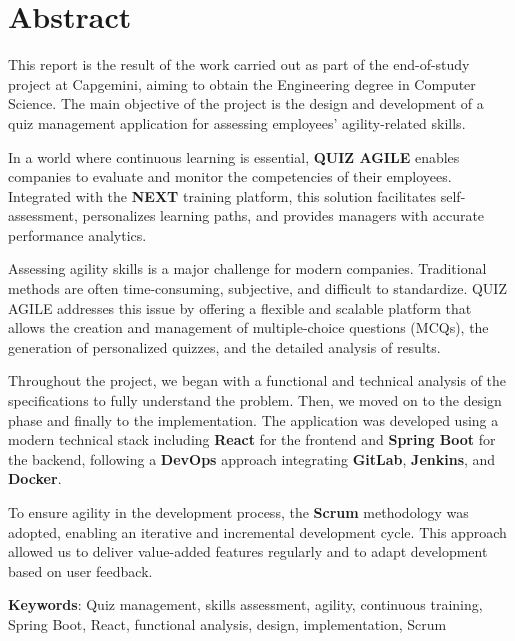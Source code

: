 \documentclass[12pt,a4paper]{report}
\begin{document}
\cleardoublepage
{}
\chapter*{Abstract}

This report is the result of the work carried out as part of the end-of-study project at Capgemini, aiming to obtain the Engineering degree in Computer Science. The main objective of the project is the design and development of a quiz management application for assessing employees' agility-related skills.

In a world where continuous learning is essential, \textbf{QUIZ AGILE} enables companies to evaluate and monitor the competencies of their employees. Integrated with the \textbf{NEXT} training platform, this solution facilitates self-assessment, personalizes learning paths, and provides managers with accurate performance analytics.

Assessing agility skills is a major challenge for modern companies. Traditional methods are often time-consuming, subjective, and difficult to standardize. QUIZ AGILE addresses this issue by offering a flexible and scalable platform that allows the creation and management of multiple-choice questions (MCQs), the generation of personalized quizzes, and the detailed analysis of results.

Throughout the project, we began with a functional and technical analysis of the specifications to fully understand the problem. Then, we moved on to the design phase and finally to the implementation. The application was developed using a modern technical stack including \textbf{React} for the frontend and \textbf{Spring Boot} for the backend, following a \textbf{DevOps} approach integrating \textbf{GitLab}, \textbf{Jenkins}, and \textbf{Docker}.

To ensure agility in the development process, the \textbf{Scrum} methodology was adopted, enabling an iterative and incremental development cycle. This approach allowed us to deliver value-added features regularly and to adapt development based on user feedback.

\textbf{Keywords}: Quiz management, skills assessment, agility, continuous training, Spring Boot, React, functional analysis, design, implementation, Scrum

\cleardoublepage
{}
\end{document}
